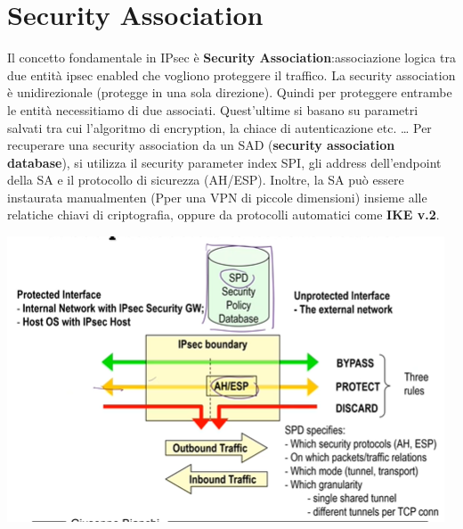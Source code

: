 \documentclass{book}
\theoremstyle{remark}
\begin{document}
\section{Security Association}
Il concetto fondamentale in IPsec è \textbf{Security Association}:\@una associazione logica tra due entità ipsec enabled che vogliono proteggere il traffico\@. La security association è unidirezionale (protegge in una sola direzione)\@. Quindi per proteggere entrambe le entità necessitiamo di due associati\@.\newline
Quest'ultime si basano su parametri salvati tra cui l'algoritmo di encryption, la chiace di autenticazione etc\@. \dots
Per recuperare una security association da un SAD (\textbf{security association database}), si utilizza il security parameter index SPI, gli address dell'endpoint della SA e il protocollo di sicurezza (AH/ESP)\@. Inoltre, la SA può essere instaurata manualmenten (Pper una VPN di piccole dimensioni) insieme alle relatiche chiavi di criptografia, oppure da protocolli automatici come \textbf{IKE v\@.2}\@.
\begin{center}
	\includegraphics[scale=0.6]{2021-12-12-17-03-03.png}
\end{center}
\end{document}
